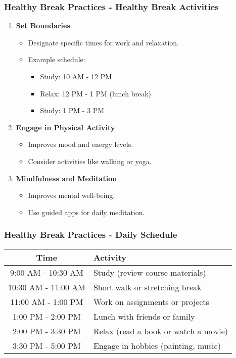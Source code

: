 \documentclass[aspectratio=169]{beamer}
\begin{document}
\begin{frame}[fragile]
  \frametitle{Healthy Break Practices - Healthy Break Activities}
  \begin{enumerate}
    \item \textbf{Set Boundaries}
      \begin{itemize}
        \item Designate specific times for work and relaxation.
        \item Example schedule: 
          \begin{itemize}
            \item Study: 10 AM - 12 PM
            \item Relax: 12 PM - 1 PM (lunch break)
            \item Study: 1 PM - 3 PM
          \end{itemize}
      \end{itemize}
      
    \item \textbf{Engage in Physical Activity}
      \begin{itemize}
        \item Improves mood and energy levels.
        \item Consider activities like walking or yoga.
      \end{itemize}

    \item \textbf{Mindfulness and Meditation}
      \begin{itemize}
        \item Improves mental well-being.
        \item Use guided apps for daily meditation.
      \end{itemize}
  \end{enumerate}
\end{frame}

\begin{frame}[fragile]
  \frametitle{Healthy Break Practices - Daily Schedule}
  \begin{center}
    \begin{tabular}{|c|l|}
      \hline
      \textbf{Time} & \textbf{Activity} \\
      \hline
      9:00 AM - 10:30 AM & Study (review course materials) \\
      \hline
      10:30 AM - 11:00 AM & Short walk or stretching break \\
      \hline
      11:00 AM - 1:00 PM & Work on assignments or projects \\
      \hline
      1:00 PM - 2:00 PM & Lunch with friends or family \\
      \hline
      2:00 PM - 3:30 PM & Relax (read a book or watch a movie) \\
      \hline
      3:30 PM - 5:00 PM & Engage in hobbies (painting, music) \\
      \hline
    \end{tabular}
  \end{center}
\end{frame}
\end{document}
